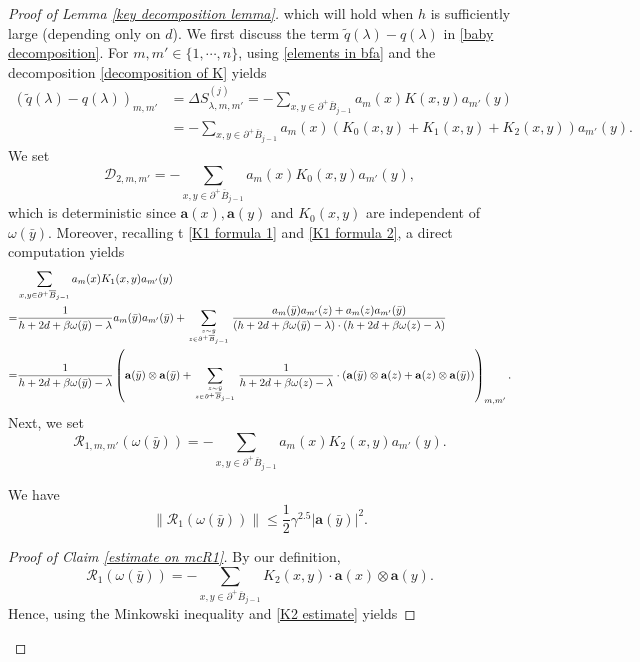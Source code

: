 \documentclass[10pt,a4paper]{amsart}
\newcommand{\barB}{\overline{B}}
\newcommand{\bfa}{\mathbf{a}}
\newcommand{\diffSj}{\Delta {S}^{(j)}}
\newcommand{\mcD}{\mathcal{D}}
\newcommand{\mcR}{\mathcal{R}}
\newcommand{\tq}{\tilde{q}}
\newcommand{\whn}{\widehat{n}}
\begin{document}
\begin{proof}[Proof of Lemma \ref{key decomposition lemma}]
which will hold when $h$ is sufficiently large (depending only on $d$). 
We first discuss the term $\tq(\lambda)-q(\lambda)$ in \eqref{baby decomposition}. For $m,m'\in \{1,\cdots,\whn \}$, using \eqref{elements in bfa} and the decomposition \eqref{decomposition of K} yields 
\begin{align*}
  (\tq(\lambda)-q(\lambda))_{m,m'} & = \diffSj_{\lambda,m,m'}= -\sum_{x,y\in \partial^+ \barB_{j-1}}a_{m}(x) K(x,y) a_{m'}(y)\\
    &=-\sum_{x,y\in \partial^+ \barB_{j-1}}a_{m}(x)\left(K_0(x,y) +K_1(x,y)+K_2(x,y) \right)a_{m'}(y).
\end{align*}
We set 
\begin{equation}\label{mcD2}
  \mcD_{2,m,m'}=-\sum_{x,y\in \partial^+ \barB_{j-1}}a_{m}(x)K_0(x,y)a_{m'}(y),
\end{equation}
which is deterministic since $\bfa(x),\bfa(y)$ and $K_0(x,y)$ are independent of $\omega(\bar{y})$.
Moreover, recalling t \eqref{K1 formula 1} and \eqref{K1 formula 2}, a direct computation yields 
{\small
\begin{align*}
  &\sum_{x,y\in \partial^+ \barB_{j-1}}a_{m}(x)K_1(x,y)a_{m'}(y) \\
  =& \frac{1}{h+2d+\beta\omega(\bar{y})-\lambda}a_{m}(\bar{y}) a_{m'}(\bar{y}) + \sum_{z\sim \bar{y} \atop z\in \partial^+\barB_{j-1}} \frac{a_m(\bar{y})a_{m'}(z)+a_m(z)a_{m'}(\bar{y})}{(h+2d+\beta\omega(\bar{y})-\lambda)\cdot (h+2d+\beta\omega(z)-\lambda)} \\
  =&\frac{1}{h+2d+\beta \omega(\bar{y})-\lambda}\left(\bfa(\bar{y})\otimes \bfa(\bar{y})+ \sum_{z\sim \bar{y} \atop z\in \partial^+\barB_{j-1}} \frac{1}{h+2d+\beta\omega(z)-\lambda } \cdot(\bfa(\bar{y}) \otimes  \bfa(z)+\bfa(z)\otimes\bfa(\bar{y})  )\right)_{m,m'}.
\end{align*}
}
Next, we set
\begin{equation}\label{mcR1}
  \mcR_{1,m,m'}(\omega(\bar{y}))=-\sum_{x,y\in \partial^+ \barB_{j-1}}a_{m}(x)K_2(x,y)a_{m'}(y).
\end{equation}
\begin{claim}\label{estimate on mcR1}
  We have 
  \[\|\mcR_{1}(\omega(\bar{y}))\| \leq \frac{1}{2}\gamma^{2.5} |\bfa(\bar{y})|^2. \]
\end{claim}
\begin{proof}[Proof of Claim \ref{estimate on mcR1}]
  By our definition,
  \[\mcR_1(\omega(\bar{y}))=-\sum_{x,y\in \partial^+ \barB_{j-1}}K_2(x,y)\cdot \bfa(x)\otimes \bfa(y).\]
  Hence, using the Minkowski inequality and \eqref{K2 estimate} yields

\end{proof}
\end{proof}
\end{document}
